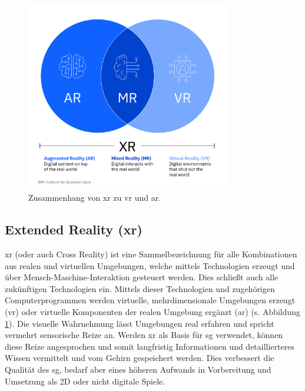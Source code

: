 \documentclass[conference]{IEEEtran}
\begin{document}
\begin{figure}[htbp]
\centerline{\includegraphics[width=9cm]{ibm_ar.png}}
\caption{Zusammenhang von \gls{xr} zu \gls{vr} und \gls{ar}.\cite{a9}}
\label{xrvrar_fig}
\end{figure}

\subsection{Extended Reality (\gls{xr})}
\gls{xr} (oder auch Cross Reality) ist eine Sammelbezeichnung für alle Kombinationen aus realen und virtuellen Umgebungen,
welche mittels Technologien erzeugt und über Mensch-Maschine-Interaktion gesteuert werden.
Dies schließt auch alle zukünftigen Technologien ein.
Mittels dieser Technologien und zugehörigen Computerprogrammen werden virtuelle, mehrdimensionale Umgebungen erzeugt (\gls{vr}) oder virtuelle Komponenten
der realen Umgebung ergänzt (\gls{ar}) (s. Abbildung \ref{xrvrar_fig}).
Die visuelle Wahrnehmung lässt Umgebungen real erfahren und spricht vermehrt sensorische Reize an.
Werden \gls{xr} als Basis für \gls{sg} verwendet, können diese Reize angesprochen und somit langfristig Informationen und detaillierteres Wissen vermittelt und
vom Gehirn gespeichert werden. Dies verbessert die Qualität des \gls{sg}, bedarf aber eines höheren Aufwands in Vorbereitung und Umsetzung als 2D oder nicht digitale Spiele.
\end{document}
